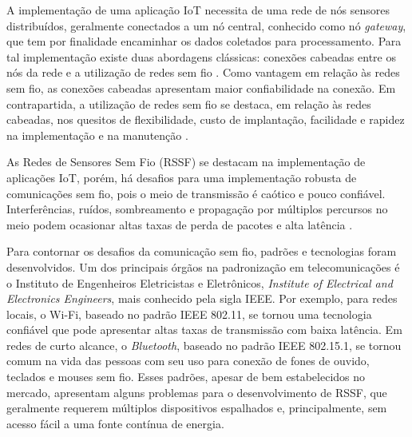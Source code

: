 
A implementação de uma aplicação IoT necessita de uma rede de nós sensores distribuídos, geralmente conectados a um nó central, conhecido como nó \emph{gateway}, que tem por finalidade encaminhar os dados coletados para processamento. Para tal implementação existe duas abordagens clássicas: conexões cabeadas entre os nós da rede e a utilização de redes sem fio \cite{gomes2017estimaccao}. Como vantagem em relação às redes sem fio, as conexões cabeadas apresentam maior confiabilidade na conexão. Em contrapartida, a utilização de redes sem fio se destaca, em relação às redes cabeadas, nos quesitos de flexibilidade, custo de implantação, facilidade e rapidez na implementação e na manutenção \cite{gungor2009industrial}.

As Redes de Sensores Sem Fio (RSSF) se destacam na implementação de aplicações IoT, porém, há desafios para uma implementação robusta de comunicações sem fio, pois o meio de transmissão é caótico e pouco confiável. Interferências, ruídos, sombreamento e propagação por múltiplos percursos no meio podem ocasionar altas taxas de perda de pacotes e alta latência \cite{gomes2017estimaccao}.

Para contornar os desafios da comunicação sem fio, padrões e tecnologias foram desenvolvidos. Um dos principais órgãos na padronização em telecomunicações é o Instituto de Engenheiros Eletricistas e Eletrônicos, \emph{Institute of Electrical and Electronics Engineers}, mais conhecido pela sigla IEEE. Por exemplo, para redes locais, o Wi-Fi, baseado no padrão IEEE 802.11, se tornou uma tecnologia confiável que pode apresentar altas taxas de transmissão com baixa latência. Em redes de curto alcance, o \emph{Bluetooth}, baseado no padrão IEEE 802.15.1, se tornou comum na vida das pessoas com seu uso para conexão de fones de ouvido, teclados e mouses sem fio. Esses padrões, apesar de bem estabelecidos no mercado, apresentam alguns problemas para o desenvolvimento de RSSF, que geralmente requerem múltiplos dispositivos espalhados e, principalmente, sem acesso fácil a uma fonte contínua de energia.

